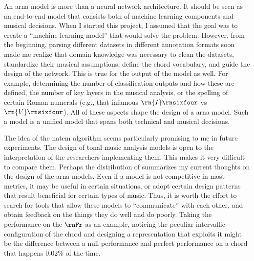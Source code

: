 
An \gls{arna} model is more than a neural network
architecture. It should be seen as an end-to-end model that
consists both of machine learning components and musical
decisions. When I started this project, I assumed that the
goal was to create a ``machine learning model'' that would
solve the problem. However, from the beginning, parsing
different datasets in different annotation formats soon made
me realize that domain knowledge was necessary to clean the
datasets, standardize their musical assumptions, define the
chord vocabulary, and guide the design of the network. This
is true for the output of the model as well. For example,
determining the number of classification outputs and how
these are defined, the number of key layers in the musical
analysis, or the spelling of certain Roman numerals (e.g.,
that infamous $\rn{I}\rnsixfour$ vs $\rn{V}\rnsixfour$). All
of these aspects shape the design of a \gls{arna} model.
Such a model is a unified model that spans both technical
and musical decisions.

The idea of the \gls{natem} algorithm seems particularly
promising to me in future experiments. The design of tonal
music analysis models is open to the interpretation of the
researchers implementing them. This makes it very difficult
to compare them. Perhaps the distribution of
 summarizes my current thoughts on the
design of the \gls{arna} models. Even if a model is not
competitive in most metrics, it may be useful in certain
situations, or adopt certain design patterns that result
beneficial for certain types of music. Thus, it is worth the
effort to search for tools that allow these models to
``communicate'' with each other, and obtain feedback on the
things they do well and do poorly. Taking the performance on
the $\rnFr$ as an example, noticing the peculiar intervallic
configuration of the chord and designing a representation
that exploits it might be the difference between a null
performance and perfect performance on a chord that happens
0.02\% of the time.



